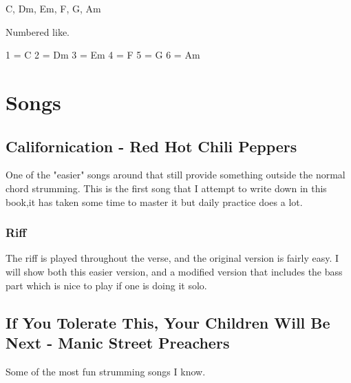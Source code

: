 \documentclass[11pt]{book}
\begin{document}
    C, Dm, Em, F, G, Am

    Numbered like.

    1 = C
    2 = Dm
    3 = Em
    4 = F
    5 = G
    6 = Am


    \chapter{Songs}


    \section{Californication - Red Hot Chili Peppers}
    One of the "easier" songs around that still provide something outside the normal chord strumming.
    This is the first song that I attempt to write down in this book,it has taken some time to master it but daily practice does a lot.

    \subsection{Riff}
    The riff is played throughout the verse, and the original version is fairly easy.
    I will show both this easier version, and a modified version that includes the bass part which is nice to play if one is doing it solo.


    \section{If You Tolerate This, Your Children Will Be Next - Manic Street Preachers}
    Some of the most fun strumming songs I know.
\end{document}
